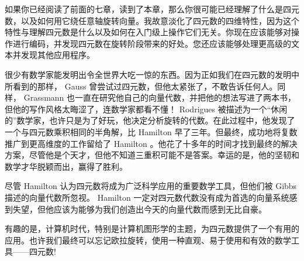 
如果你已经阅读了前面的七章，读到了本章，那么你很可能已经理解了什么是四元数，以及如何用它绕任意轴旋转向量。我故意淡化了四元数的四维特性，因为这个特性与理解四元数是什么以及如何在入门级上操作它们无关。你现在应该能够对操作进行编码，并发现四元数在旋转阶段带来的好处。您还应该能够处理更高级的文本并发现其他应用程序。

很少有数学家能发明出令全世界大吃一惊的东西。因为正如我们在四元数的发明中所看到的那样， Gauss 曾尝试过四元数，但他太紧张了，不敢告诉任何人。同样， Grassmann 也一直在研究他自己的向量代数，并把他的想法写进了两本书，但他的写作风格太晦涩了，连数学家都看不懂！ Rodrigues 被描述为一个“休闲的”数学家，也许只是为了好玩，他决定分析旋转的代数。在此过程中，他发现了一个与四元数乘积相同的半角解，比 Hamilton 早了三年。但最终，成功地将复数推广到更高维度的工作留给了 Hamilton 。他花了十多年的时间才找到最终的解决方案，尽管他是个天才，但他不知道三重积可能不是答案。幸运的是，他的坚韧和数学才华脱颖而出，赢得了胜利。

尽管 Hamilton 认为四元数将成为广泛科学应用的重要数学工具，但他们被 Gibbs描述的向量代数所忽视。 Hamilton 一定对四元数代数没有成为首选的向量系统感到失望，但他应该为能够为我们创造出今天的向量代数而感到无比自豪。

有趣的是，计算机时代，特别是计算机图形学的主题，为四元数提供了一个有用的应用。也许我们最终可以忘记欧拉旋转，使用一种直观、易于使用和有效的数学工具——四元数!


